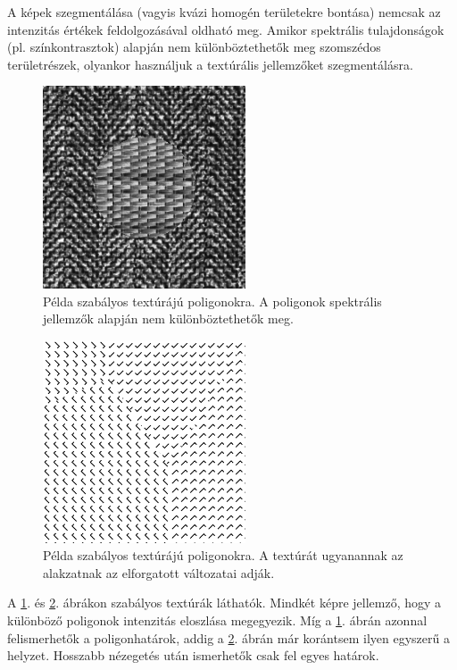 \documentclass[a4paper,12pt]{article}
\begin{document}
A képek szegmentálása (vagyis kvázi homogén területekre bontása) nemcsak az intenzitás értékek feldolgozásával oldható meg. Amikor spektrális tulajdonságok (pl. színkontrasztok) alapján nem különböztethetők meg szomszédos területrészek, olyankor használjuk a textúrális jellemzőket szegmentálásra. 


\begin{figure}
	\centering
	\includegraphics[width=6cm]{textura1.png}
	\caption{Példa szabályos textúrájú poligonokra. A poligonok spektrális jellemzők alapján nem különböztethetők meg.}
	\label{fig:textura1}
\end{figure}


\begin{figure}
	\centering
	\includegraphics[width=6cm]{textura2.png}
	\caption{Példa szabályos textúrájú poligonokra. A textúrát ugyanannak az alakzatnak az elforgatott változatai adják.}
	\label{fig:textura2}
\end{figure}


A \ref{fig:textura1}. és \ref{fig:textura2}. ábrákon szabályos textúrák láthatók. Mindkét képre jellemző, hogy a különböző poligonok intenzitás eloszlása megegyezik. Míg a \ref{fig:textura1}. ábrán azonnal felismerhetők a poligonhatárok, addig a \ref{fig:textura2}. ábrán már korántsem ilyen egyszerű a helyzet. Hosszabb nézegetés után ismerhetők csak fel egyes határok.
\end{document}

